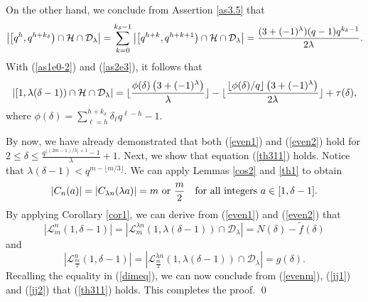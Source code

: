 \documentclass[journal,onecolumn]{IEEEtran}
\begin{document}
On the other hand, we conclude from Assertion \ref{as3.5} that 
\begin{equation}\notag
    \left|\left[q^{h}, q^{h+k_{\delta}} \right)\cap \mathcal{H}\cap \mathcal{D}_{\lambda}   \right| =\sum\limits_{k=0}^{k_{\delta}-1}\left|
    \left[q^{h+k}, q^{h+k+1}\right)\cap \mathcal{H}\cap \mathcal{D}_{\lambda}\right| = \frac{(3+(-1)^{\lambda})(q-1)q^{k_{\delta}-1}}{2\lambda}.
\end{equation}
With  (\ref{as1e0-2}) and (\ref{as2e3}), it follows that 
\begin{equation}\notag
     \left|\left[1, \lambda(\delta-1) \right)\cap \mathcal{H}\cap \mathcal{D}_{\lambda}   \right| =  \lfloor  \frac{\phi(\delta)\left(3+(-1)^{\lambda}
            \right)}{\lambda} \rfloor -\lfloor  \frac{\lfloor \phi(\delta)/q \rfloor\left(3+(-1)^{\lambda}
            \right) }{2\lambda}   \rfloor +\tau(\delta),
\end{equation}
where $\phi(\delta)=\sum\limits_{\ell=h}^{h+k_{\delta}}\delta_{\ell}q^{\ell-h}-1$. 

By now, we have already demonstrated that both  (\ref{even1}) and (\ref{even2}) hold for $ 2 \leq \delta\leq  \frac{q^{\lfloor (2m-1)/3\rfloor+1}-1}{\lambda}+1.$  Next, we show that equation (\ref{th311}) holds. 
Notice that
 $\lambda(\delta-1)< q^{m-\lfloor {m}/{3}\rfloor}$. We can apply    Lemmas \ref{cos2} and \ref{th1}  to obtain  \begin{equation}\label{evenm}
    |C_{n}(a)|= |C_{\lambda n}(\lambda a)|= m  \hbox{ or } \frac{m}{2} \quad  \hbox{for all  integers }  a\in [1,\delta-1].
    \end{equation}
By applying Corollary \ref{cor1}, we can derive from (\ref{even1}) and (\ref{even2}) that 
 \begin{equation}\label{jj1}
   \left |   \mathcal{L}^n_m(1,\delta-1)\right| = 
   \left |   \mathcal{L}^{\lambda n}_m\left(1,\lambda(\delta-1)\right)\cap \mathcal{D}_{\lambda} \right| = N(\delta)-\widetilde{f}(\delta)
\end{equation}
and 
 \begin{equation}\label{jj2}
  \left |   \mathcal{L}^{n}_{\frac{m}{2}}(1,\delta-1)\right|= \left |   \mathcal{L}^{\lambda n}_{\frac{m}{2}}\left(1,\lambda(\delta-1)\right)\cap \mathcal{D}_{\lambda} \right| = g(\delta).
\end{equation}
Recalling the equality in (\ref{dimeq}), we can now conclude from (\ref{evenm}), (\ref{jj1}) and (\ref{jj2}) that (\ref{th311})  holds.  This completes the proof. \qed
\end{document}
